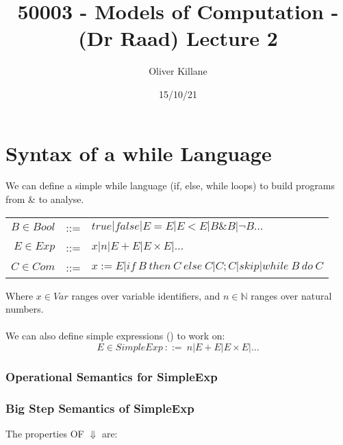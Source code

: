 \documentclass{report}
\title{50003 - Models of Computation - (Dr Raad) Lecture 2}
\author{Oliver Killane}
\date{15/10/21}
\begin{document}
\maketitle
{}

\section*{Syntax of a while Language}
We can define a simple while language (if, else, while loops) to build programs from \& to analyse.
\begin{center}
	\begin{tabular}{r c l}
		$B \in Bool$ & ::= & $true | false | E = E | E < E | B \& B | \neg B \dots$                   \\
		$E \in Exp$  & ::= & $x | n | E + E | E \times E | \dots$                                     \\
		$C \in Com$  & ::= & $x :=E | if \ B \ then \ C \ else \ C | C;C | skip | while \ B \ do \ C$ \\
	\end{tabular}
\end{center}
Where $x \in Var$ ranges over variable identifiers, and $n \in \mathbb{N}$ ranges over natural numbers.
\\
\\ We can also define simple expressions () to work on:
\[E \in SimpleExp \ ::= \ n | E + E | E \times E | \dots\]
\subsubsection*{Operational Semantics for SimpleExp}
\begin{itemize}
\end{itemize}
\subsubsection*{Big Step Semantics of SimpleExp}
The properties OF $\Downarrow$ are:
\begin{itemize}
\end{itemize}
\end{document}
